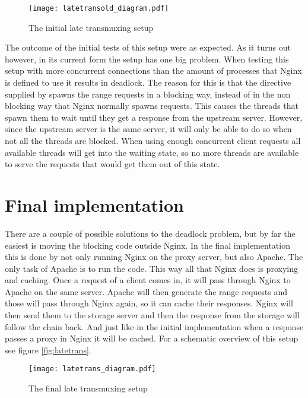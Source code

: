 \documentclass[twoside,openright]{uva-bachelor-thesis}
\begin{document}
\begin{figure}
    \texttt{[image: latetransold\_diagram.pdf]}
    \caption{The initial late transmuxing setup}\label{fig:latetransold}
\end{figure}

The outcome of the initial tests of this setup were as expected. As it turns out
however, in its current form the setup has one big problem. When testing this
setup with more concurrent connections than the amount of processes that
Nginx is defined to use it results in deadlock. The reason for this is that the
\ipplong directive supplied by \usp spawns the range requests in a blocking way,
instead of in the non blocking way that Nginx normally spawns requests. This
causes the threads that spawn them to wait until they get a response from the
upstream server. However, since the upstream server is the same server, it will
only be able to do so when not all the threads are blocked. When using enough
concurrent client requests all available threads will get into the waiting
state, so no more threads are available to serve the requests that would get
them out of this state.

\section{Final implementation}
There are a couple of possible solutions to the deadlock problem, but by far the
easiest is moving the blocking code outside Nginx. In the final implementation
this is done by not only running Nginx on the proxy server, but also Apache. The
only task of Apache is to run the \ipplong code. This way all that Nginx does is
proxying and caching. Once a request of a client comes in, it will pass
through Nginx to Apache on the same server. Apache will then generate the range
requests and those will pass through Nginx again, so it can cache their
responses. Nginx will then send them to the storage server and then the response
from the storage will follow the chain back. And just like in the initial
implementation when a response passes a proxy in Nginx it will be cached. For a
schematic overview of this setup see figure \vref{fig:latetrans}.


\begin{figure}
    \texttt{[image: latetrans\_diagram.pdf]}
    \caption{The final late transmuxing setup}\label{fig:latetrans}
\end{figure}
\end{document}
